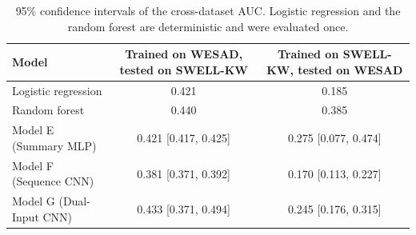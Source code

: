 \begin{table}[h!]
\centering
{}
\caption{95\% confidence intervals on SWELL-KW alone under GroupKFold, five folds over 22 subjects.}
\label{tab:ci_swell_group}
\end{table}

\begin{table}[h!]
\centering
\footnotesize
\begin{tabular}{|l|c|c|}
\hline
\textbf{Model} & \textbf{Trained on WESAD, tested on SWELL-KW} & \textbf{Trained on SWELL-KW, tested on WESAD} \\ \hline
Logistic regression & 0.421 & 0.185 \\ \hline
Random forest & 0.440 & 0.385 \\ \hline
Model E (Summary MLP) & 0.421 [0.417, 0.425] & 0.275 [0.077, 0.474] \\ \hline
Model F (Sequence CNN) & 0.381 [0.371, 0.392] & 0.170 [0.113, 0.227] \\ \hline
Model G (Dual-Input CNN) & 0.433 [0.371, 0.494] & 0.245 [0.176, 0.315] \\ \hline
\end{tabular}
\caption{95\% confidence intervals of the cross-dataset \gls{AUC}. Logistic regression and the random forest are deterministic and were evaluated once.}
\label{tab:ci_transfer}
\end{table}

